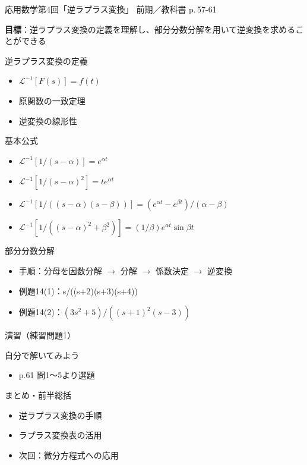 \documentclass[aspectratio=43,professionalfonts,handout]{beamer}
\newcommand{\LectureNum}{4}
\newcommand{\LectureTitle}{逆ラプラス変換}
\newcommand{\TextPages}{p.\,57-61}
\newcommand{\CourseName}{応用数学}
\renewcommand{\TermName}{前期}
\begin{document}
\begin{frame}{\CourseName\quad 第\LectureNum 回「\LectureTitle」}
  {\small \TermName\quad \TeacherName\quad ／\quad 教科書 \TextPages}

  \textbf{目標}：逆ラプラス変換の定義を理解し、部分分数分解を用いて逆変換を求めることができる

\end{frame}

\begin{frame}{逆ラプラス変換の定義}
  \begin{block}{}
  \begin{itemize}
    \item $\mathcal{L}^{-1}[F(s)] = f(t)$
    \item 原関数の一致定理
    \item 逆変換の線形性
  \end{itemize}
  \end{block}
\end{frame}

\begin{frame}{基本公式}
  \begin{block}{}
  \begin{itemize}
    \item $\mathcal{L}^{-1}[1/(s-\alpha)] = e^{\alpha t}$
    \item $\mathcal{L}^{-1}[1/(s-\alpha)^{2}] = te^{\alpha t}$
    \item $\mathcal{L}^{-1}[1/((s-\alpha)(s-\beta))] = (e^{\alpha t}-e^{\beta t})/(\alpha-\beta)$
    \item $\mathcal{L}^{-1}[1/((s-\alpha)^{2}+\beta^{2})] = (1/\beta)e^{\alpha t}\sin \beta t$
  \end{itemize}
  \end{block}
\end{frame}

\begin{frame}{部分分数分解}
  \begin{block}{}
  \begin{itemize}
    \item 手順：分母を因数分解  $\to$  分解  $\to$  係数決定  $\to$  逆変換
    \item 例題14(1)：s/((s+2)(s+3)(s+4))
    \item 例題14(2)：$(3s^{2}+5)/((s+1)^{2}(s-3))$
  \end{itemize}
  \end{block}
\end{frame}

\begin{frame}{演習（練習問題1）}
  \begin{exampleblock}{自分で解いてみよう}
  \begin{itemize}
    \item p.61 問1〜5より選題
  \end{itemize}
  \end{exampleblock}
\end{frame}

\begin{frame}{まとめ・前半総括}
  \begin{itemize}
    \item 逆ラプラス変換の手順
    \item ラプラス変換表の活用
    \item 次回：微分方程式への応用
  \end{itemize}
\end{frame}
\end{document}
